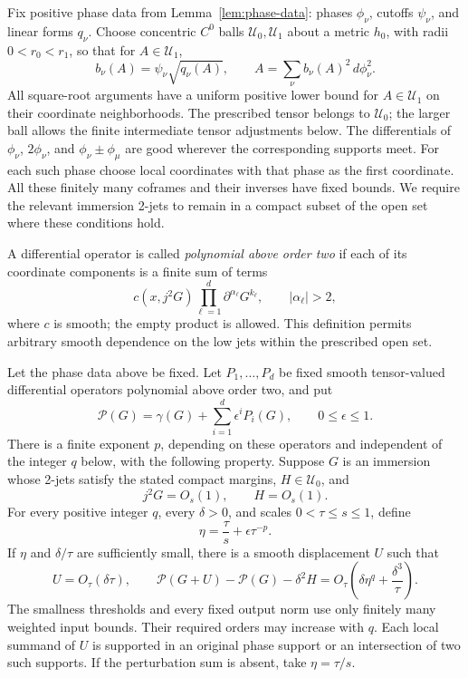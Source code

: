 Fix positive phase data from Lemma~\ref{lem:phase-data}: phases $\phi_\nu$,
cutoffs $\psi_\nu$, and linear forms $q_\nu$.  Choose concentric $C^0$ balls
$\mathcal U_0,\mathcal U_1$ about a metric $h_0$, with radii
$0<r_0<r_1$, so that for $A\in\mathcal U_1$,
\begin{equation}\label{eq:small-positive-decomposition}
 b_\nu(A)=\psi_\nu\sqrt{q_\nu(A)},\qquad
 A=\sum_\nu b_\nu(A)^2\,d\phi_\nu^2.
\end{equation}
All square-root arguments have a uniform positive lower bound for
$A\in\mathcal U_1$ on their coordinate neighborhoods.  The prescribed
tensor belongs to $\mathcal U_0$; the larger ball allows the finite
intermediate tensor adjustments below.
The differentials of $\phi_\nu$, $2\phi_\nu$, and
$\phi_\nu\pm\phi_\mu$ are good wherever the corresponding supports meet.
For each such phase choose local coordinates with that phase as the first
coordinate. All these finitely many coframes and their inverses have fixed
bounds. We require the relevant immersion 2-jets to remain in a compact subset
of the open set where these conditions hold.

A differential operator is called \emph{polynomial above order two} if each of
its coordinate components is a finite sum of terms
\begin{equation}\label{eq:polynomial-jet-monomial}
 c(x,j^2G)\prod_{\ell=1}^d\partial^{\alpha_\ell}G^{k_\ell},
 \qquad |\alpha_\ell|>2,
\end{equation}
where $c$ is smooth; the empty product is allowed. This definition permits
arbitrary smooth dependence on the low jets within the prescribed open set.

\begin{proposition}\label{prop:small-increment}
Let the phase data above be fixed. Let $P_1,\ldots,P_d$ be fixed smooth
tensor-valued differential operators polynomial above order two, and put
\[
 \mathcal P(G)=\gamma(G)+\sum_{i=1}^d\epsilon^i P_i(G),
 \qquad 0\leq\epsilon\leq1.
\]
There is a finite exponent $p$, depending on these operators and independent of
the integer $q$ below, with the following property. Suppose $G$ is an immersion
whose 2-jets satisfy the stated compact margins, $H\in\mathcal U_0$, and
\[
 j^2G=O_s(1),\qquad H=O_s(1).
\]
For every positive integer $q$, every $\delta>0$, and scales
$0<\tau\leq s\leq1$, define
\[
 \eta=\frac\tau s+\epsilon\tau^{-p}.
\]
If $\eta$ and $\delta/\tau$ are sufficiently small, there is a smooth
displacement $U$ such that
\begin{equation}\label{eq:small-increment-estimate}
 U=O_\tau(\delta\tau),\qquad
 \mathcal P(G+U)-\mathcal P(G)-\delta^2H
   =O_\tau\left(\delta\eta^q+\frac{\delta^3}{\tau}\right).
\end{equation}
The smallness thresholds and every fixed output norm use only finitely many
weighted input bounds. Their required orders may increase with $q$.
Each local summand of $U$ is supported in an original phase support or an
intersection of two such supports. If the perturbation sum is absent, take
$\eta=\tau/s$.
\end{proposition}

